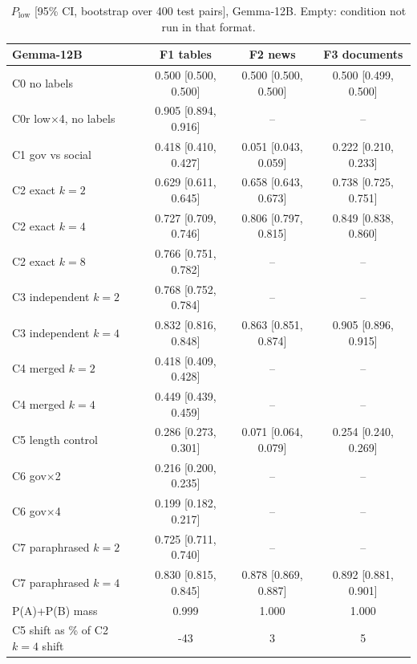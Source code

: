 \begin{table}[!htbp]\centering\scriptsize\setlength{\tabcolsep}{4pt}\begin{tabular}{@{}lccc@{}}\toprule
Gemma-12B & F1 tables & F2 news & F3 documents \\ \midrule
C0 no labels & 0.500 [0.500, 0.500] & 0.500 [0.500, 0.500] & 0.500 [0.499, 0.500] \\
C0r low$\times$4, no labels & 0.905 [0.894, 0.916] & -- & -- \\
C1 gov vs social & 0.418 [0.410, 0.427] & 0.051 [0.043, 0.059] & 0.222 [0.210, 0.233] \\
C2 exact $k{=}2$ & 0.629 [0.611, 0.645] & 0.658 [0.643, 0.673] & 0.738 [0.725, 0.751] \\
C2 exact $k{=}4$ & 0.727 [0.709, 0.746] & 0.806 [0.797, 0.815] & 0.849 [0.838, 0.860] \\
C2 exact $k{=}8$ & 0.766 [0.751, 0.782] & -- & -- \\
C3 independent $k{=}2$ & 0.768 [0.752, 0.784] & -- & -- \\
C3 independent $k{=}4$ & 0.832 [0.816, 0.848] & 0.863 [0.851, 0.874] & 0.905 [0.896, 0.915] \\
C4 merged $k{=}2$ & 0.418 [0.409, 0.428] & -- & -- \\
C4 merged $k{=}4$ & 0.449 [0.439, 0.459] & -- & -- \\
C5 length control & 0.286 [0.273, 0.301] & 0.071 [0.064, 0.079] & 0.254 [0.240, 0.269] \\
C6 gov$\times$2 & 0.216 [0.200, 0.235] & -- & -- \\
C6 gov$\times$4 & 0.199 [0.182, 0.217] & -- & -- \\
C7 paraphrased $k{=}2$ & 0.725 [0.711, 0.740] & -- & -- \\
C7 paraphrased $k{=}4$ & 0.830 [0.815, 0.845] & 0.878 [0.869, 0.887] & 0.892 [0.881, 0.901] \\
\midrule P(A)+P(B) mass & 0.999 & 1.000 & 1.000 \\
C5 shift as \% of C2 $k{=}4$ shift & -43 & 3 & 5 \\
\bottomrule\end{tabular}\caption{$P_{\text{low}}$ [95\% CI, bootstrap over 400 test pairs], Gemma-12B. Empty: condition not run in that format.}\end{table}
